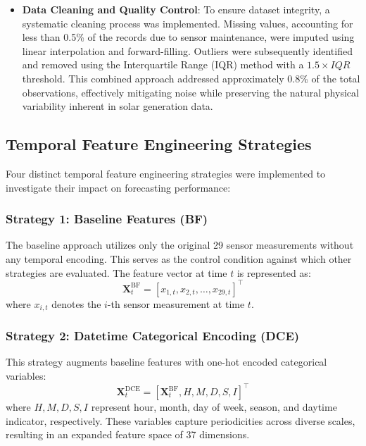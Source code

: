\documentclass[conference]{IEEEtran}
\begin{document}
\begin{itemize}
\begin{itemize}
		\end{itemize}
		\item \textbf{Data Cleaning and Quality Control}: To ensure dataset integrity, a systematic cleaning process was implemented. Missing values, accounting for less than 0.5\% of the records due to sensor maintenance, were imputed using linear interpolation and forward-filling. Outliers were subsequently identified and removed using the Interquartile Range (IQR) method with a $1.5 \times IQR$ threshold. This combined approach addressed approximately 0.8\% of the total observations, effectively mitigating noise while preserving the natural physical variability inherent in solar generation data.
	\end{itemize}
	
	\subsection{Temporal Feature Engineering Strategies}
	Four distinct temporal feature engineering strategies were implemented to investigate their impact on forecasting performance:
	
	\subsubsection{Strategy 1: Baseline Features (BF)}
	The baseline approach utilizes only the original 29 sensor measurements without any temporal encoding. This serves as the control condition against which other strategies are evaluated. The feature vector at time $t$ is represented as:
	\begin{equation*}
		\mathbf{X}_t^{\text{BF}} = [x_{1,t}, x_{2,t}, \ldots, x_{29,t}]^\top
	\end{equation*}
	where $x_{i,t}$ denotes the $i$-th sensor measurement at time $t$.
	
	\subsubsection{Strategy 2: Datetime Categorical Encoding (DCE)}
	This strategy augments baseline features with one-hot encoded categorical variables:
	\begin{equation*}
		\mathbf{X}_t^{\text{DCE}} = [\mathbf{X}_t^{\text{BF}}, H, M, D, S, I]^\top
	\end{equation*}
	where $H, M, D, S, I$ represent hour, month, day of week, season, and daytime indicator, respectively. These variables capture periodicities across diverse scales, resulting in an expanded feature space of 37 dimensions.
	
\end{document}

